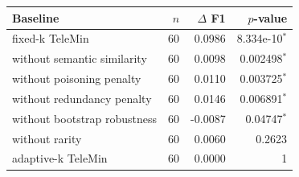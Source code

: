 \begin{tabular}{lrrr}
\toprule
Baseline & $n$ & $\Delta$ F1 & $p$-value \\
\midrule
fixed-k TeleMin & 60 & 0.0986 & 8.334e-10$^*$ \\
without semantic similarity & 60 & 0.0098 & 0.002498$^*$ \\
without poisoning penalty & 60 & 0.0110 & 0.003725$^*$ \\
without redundancy penalty & 60 & 0.0146 & 0.006891$^*$ \\
without bootstrap robustness & 60 & -0.0087 & 0.04747$^*$ \\
without rarity & 60 & 0.0060 & 0.2623 \\
adaptive-k TeleMin & 60 & 0.0000 & 1 \\
\bottomrule
\end{tabular}
